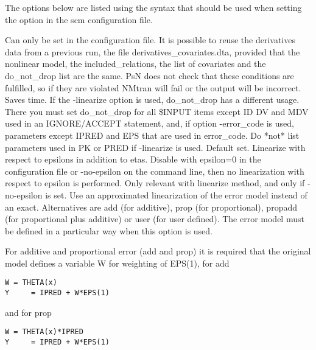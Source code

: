The options below are listed using the syntax that should be used when setting the option in the scm configuration file.
\begin{optionlist}
Can only be set in the configuration file. It is possible to reuse the derivatives data from a previous run, the file derivatives\_covariates.dta, provided that the nonlinear model, the included\_relations, the list of covariates and the do\_not\_drop list are the same. PsN does not check that these conditions are fulfilled, so if they are violated NMtran will fail or the output will be incorrect. Saves time.
\nextopt
{}
If the -linearize option is used, do\_not\_drop has a different usage. There you must set do\_not\_drop for all \$INPUT items except ID DV and MDV used in an IGNORE/ACCEPT statement, and, if option -error\_code is used, parameters except IPRED and EPS that are used in error\_code. Do *not* list parameters used in PK or PRED if -linearize is used.
\nextopt
{}
Default set. Linearize with respect to epsilons in addition to etas. Disable with epsilon=0 in the configuration file or -no-epsilon on the command line, then no linearization with respect to epsilon is performed. 
\nextopt
{}
Only relevant with linearize method, and only if -no-epsilon is set. Use an approximated linearization of the error model instead of an exact. Alternatives are add (for additive), prop (for proportional), propadd (for proportional plus additive) or user (for user defined). The error model must be defined in a particular way when this option is used.  

For additive and proportional error (add and prop) it is required that the original model defines a variable W for weighting of EPS(1), for add
\begin{verbatim}
W = THETA(x)
Y     = IPRED + W*EPS(1)
\end{verbatim}
and for prop
\begin{verbatim}
W = THETA(x)*IPRED
Y     = IPRED + W*EPS(1)
\end{verbatim}


\end{optionlist}
